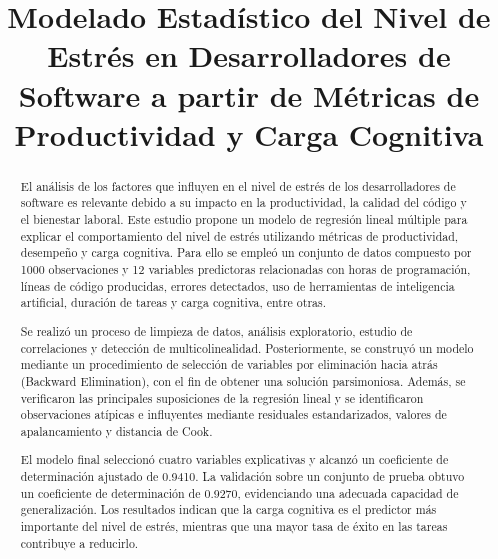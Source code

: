 \documentclass[conference]{IEEEtran}
\begin{document}
\title{Modelado Estadístico del Nivel de Estrés en Desarrolladores de Software a partir de Métricas de Productividad y Carga Cognitiva}

\author{
}

\maketitle

\begin{abstract}
El análisis de los factores que influyen en el nivel de estrés de los desarrolladores de software es relevante debido a su impacto en la productividad, la calidad del código y el bienestar laboral. Este estudio propone un modelo de regresión lineal múltiple para explicar el comportamiento del nivel de estrés utilizando métricas de productividad, desempeño y carga cognitiva. Para ello se empleó un conjunto de datos compuesto por 1000 observaciones y 12 variables predictoras relacionadas con horas de programación, líneas de código producidas, errores detectados, uso de herramientas de inteligencia artificial, duración de tareas y carga cognitiva, entre otras.

Se realizó un proceso de limpieza de datos, análisis exploratorio, estudio de correlaciones y detección de multicolinealidad. Posteriormente, se construyó un modelo mediante un procedimiento de selección de variables por eliminación hacia atrás (Backward Elimination), con el fin de obtener una solución parsimoniosa. Además, se verificaron las principales suposiciones de la regresión lineal y se identificaron observaciones atípicas e influyentes mediante residuales estandarizados, valores de apalancamiento y distancia de Cook.

El modelo final seleccionó cuatro variables explicativas y alcanzó un coeficiente de determinación ajustado de 0.9410. La validación sobre un conjunto de prueba obtuvo un coeficiente de determinación de 0.9270, evidenciando una adecuada capacidad de generalización. Los resultados indican que la carga cognitiva es el predictor más importante del nivel de estrés, mientras que una mayor tasa de éxito en las tareas contribuye a reducirlo.

\end{abstract}
\end{document}
